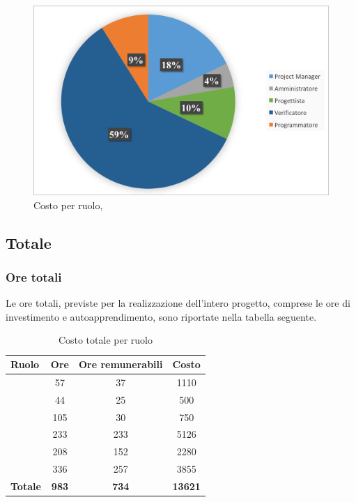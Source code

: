 \begin{figure}[H]
	\centering 
	\includegraphics[scale=0.7]{Immagini/GraficiTorteSezione6/VV.png}
	\caption{Costo per ruolo, \VV}
\end{figure}

\newpage
\subsection{Totale}
\subsubsection{Ore totali}
Le ore totali, previste per la realizzazione dell'intero progetto, comprese le ore di investimento e autoapprendimento, sono riportate nella tabella seguente.

\begin{table}[h]
	\begin{center}
		\begin{tabular}{|l|c|c|c|}
			\hline
			\textbf{Ruolo}	& \textbf{Ore} &	\textbf{Ore remunerabili}	 &\textbf{Costo} \\
			\hline
			\textit{\Pm}	&	57	&	37	&	1110	\\
			\hline
			\textit{\Am}	&	44	&	25	&	500	\\
			\hline
			\textit{\An}	&	105	&	30	&	750	\\
			\hline
			\textit{\Prog}	&	233	&	233	&	5126	\\
			\hline
			\textit{\Progr}	&	208	&	152	&	2280	\\
			\hline
			\textit{\Ver}	&	336	&	257	&	3855	\\
			\hline
			\textbf{Totale}	&	\textbf{983} & \textbf{734} & \textbf{13621}	\\
			\hline
		\end{tabular}
	\end{center}
	\caption{Costo totale per ruolo}
\end{table}

